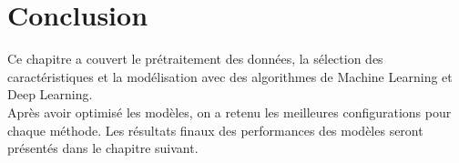 \section{Conclusion}

Ce chapitre a couvert le prétraitement des données, la sélection des caractéristiques et la modélisation avec des algorithmes de Machine Learning et Deep Learning.\\ 
Après avoir optimisé les modèles, on a retenu les meilleures configurations pour chaque méthode. Les résultats finaux des performances des modèles seront présentés dans le chapitre suivant.
